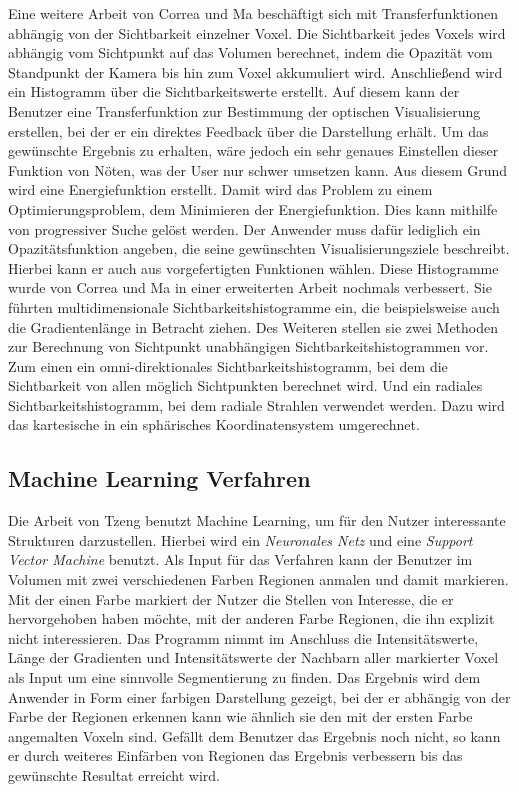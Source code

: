Eine weitere Arbeit \cite{correa2009visibility} von Correa und Ma beschäftigt sich mit Transferfunktionen abhängig von der Sichtbarkeit einzelner Voxel.
Die Sichtbarkeit jedes Voxels wird abhängig vom Sichtpunkt auf das Volumen berechnet, indem die Opazität vom Standpunkt der Kamera bis hin zum Voxel akkumuliert wird. Anschließend wird ein Histogramm über die Sichtbarkeitswerte erstellt.
Auf diesem kann der Benutzer eine Transferfunktion zur Bestimmung der optischen Visualisierung erstellen, bei der er ein direktes Feedback über die Darstellung erhält.
Um das gewünschte Ergebnis zu erhalten, wäre jedoch ein sehr genaues Einstellen dieser Funktion von Nöten, was der User nur schwer umsetzen kann.
Aus diesem Grund wird eine Energiefunktion erstellt. Damit wird das Problem zu einem Optimierungsproblem, dem Minimieren der Energiefunktion. Dies kann mithilfe von progressiver Suche gelöst werden. 
Der Anwender muss dafür lediglich ein Opazitätsfunktion angeben, die seine gewünschten Visualisierungsziele beschreibt. Hierbei kann er auch aus vorgefertigten Funktionen wählen.
Diese Histogramme wurde von Correa und Ma in einer erweiterten Arbeit \cite{correa2011visibility} nochmals verbessert. Sie führten multidimensionale Sichtbarkeitshistogramme ein, die beispielsweise auch die Gradientenlänge in Betracht ziehen.
Des Weiteren stellen sie zwei Methoden zur Berechnung von Sichtpunkt unabhängigen Sichtbarkeitshistogrammen vor. Zum einen ein omni-direktionales Sichtbarkeitshistogramm, bei dem die Sichtbarkeit von allen möglich Sichtpunkten berechnet wird. Und ein radiales Sichtbarkeitshistogramm, bei dem radiale Strahlen verwendet werden. Dazu wird das kartesische in ein sphärisches Koordinatensystem umgerechnet.



\subsection{Machine Learning Verfahren}

Die Arbeit von Tzeng \cite{tzeng2005intelligent} benutzt Machine Learning, um für den Nutzer interessante Strukturen darzustellen. Hierbei wird ein \textit{Neuronales Netz} und eine \textit{Support Vector Machine} benutzt.
Als Input für das Verfahren kann der Benutzer im Volumen mit zwei verschiedenen Farben Regionen anmalen und damit markieren. Mit der einen Farbe markiert der Nutzer die Stellen von Interesse, die er hervorgehoben haben möchte, mit der anderen Farbe Regionen, die ihn explizit nicht interessieren.
\newline
Das Programm nimmt im Anschluss die Intensitätswerte, Länge der Gradienten und Intensitätswerte der Nachbarn aller markierter Voxel als Input um eine sinnvolle Segmentierung zu finden.
Das Ergebnis wird dem Anwender in Form einer farbigen Darstellung gezeigt, bei der er abhängig von der Farbe der Regionen erkennen kann wie ähnlich sie den mit der ersten Farbe angemalten Voxeln sind. Gefällt dem Benutzer das Ergebnis noch nicht, so kann er durch weiteres Einfärben von Regionen das Ergebnis verbessern bis das gewünschte Resultat erreicht wird.


